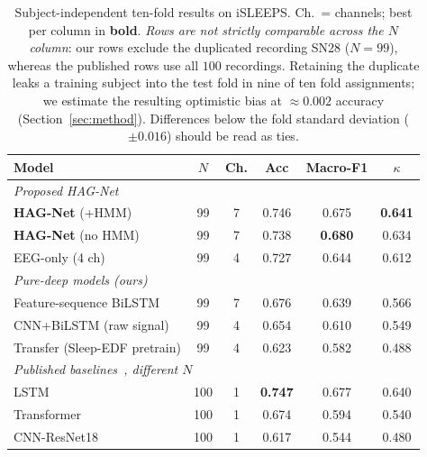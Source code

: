\documentclass[journal]{IEEEtran}
\newcommand{\hagAccR}{0.738}   %
\newcommand{\hagMfR}{0.680}    %
\newcommand{\hagKR}{0.634}     %
\newcommand{\hagAccH}{0.746}   %
\newcommand{\hagMfH}{0.675}    %
\newcommand{\hagKH}{0.641}     %
\begin{document}
\begin{table}[t]
\caption{Subject-independent ten-fold results on iSLEEPS. Ch.\ = channels; best per
column in \textbf{bold}. \emph{Rows are not strictly comparable across the $N$
column}: our rows exclude the duplicated recording SN28 ($N=99$), whereas the
published rows use all $100$ recordings. Retaining the duplicate leaks a training
subject into the test fold in nine of ten fold assignments; we estimate the resulting
optimistic bias at $\approx0.002$ accuracy (Section~\ref{sec:method}). Differences
below the fold standard deviation ($\pm0.016$) should be read as ties.}
\label{tab:main}
\centering
\setlength{\tabcolsep}{3.5pt}
\begin{tabular}{lccccc}
\toprule
Model & $N$ & Ch. & Acc & Macro-F1 & $\kappa$ \\
\midrule
\multicolumn{6}{l}{\emph{Proposed HAG-Net}}\\
\textbf{HAG-Net} (+HMM)           & 99 & 7 & \hagAccH & \hagMfH & \textbf{\hagKH} \\
\textbf{HAG-Net} (no HMM)         & 99 & 7 & \hagAccR & \textbf{\hagMfR} & \hagKR \\
\;\; EEG-only (4 ch)              & 99 & 4 & 0.727 & 0.644 & 0.612 \\
\midrule
\multicolumn{6}{l}{\emph{Pure-deep models (ours)}}\\
Feature-sequence BiLSTM           & 99 & 7 & 0.676 & 0.639 & 0.566 \\
CNN+BiLSTM (raw signal)           & 99 & 4 & 0.654 & 0.610 & 0.549 \\
Transfer (Sleep-EDF pretrain)     & 99 & 4 & 0.623 & 0.582 & 0.488 \\
\midrule
\multicolumn{6}{l}{\emph{Published baselines~\cite{maiti2026isleeps}, different $N$}}\\
LSTM                              & 100 & 1 & \textbf{0.747} & 0.677 & 0.640 \\
Transformer                       & 100 & 1 & 0.674 & 0.594 & 0.540 \\
CNN-ResNet18                      & 100 & 1 & 0.617 & 0.544 & 0.480 \\
\bottomrule
\end{tabular}
\end{table}
\end{document}
